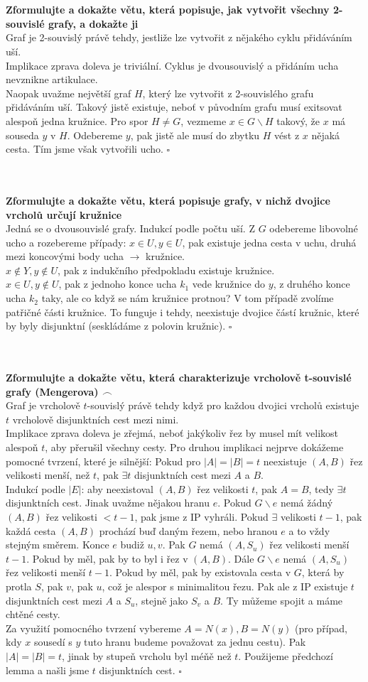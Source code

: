 \documentclass[a4paper]{article}
\newcommand{\led}{\hspace{0.2cm}$\square$}
\newcommand{\hlava}[1]{\text{} \\ \text{} \\ \text{} \hspace{-0.27cm} \textbf{#1} \\}
\begin{document}
\hlava{Zformulujte a dokažte větu, která popisuje, jak vytvořit všechny 2-souvislé grafy, a dokažte ji}
Graf je 2-souvislý právě tehdy, jestliže lze vytvořit z nějakého cyklu přidáváním uší.\\
Implikace zprava doleva je triviální. Cyklus je dvousouvislý a přidáním ucha nevznikne artikulace. \\
Naopak uvažme největší graf $H$, který lze vytvořit z 2-souvislého grafu přidáváním uší. Takový jistě existuje, neboť v původním grafu musí exitsovat alespoň jedna kružnice. Pro spor $H \ne G$, vezmeme $x\in G \backslash H$ takový, že $x$ má souseda $y$ v $H$. Odebereme $y$, pak jistě ale musí do zbytku $H$ vést z $x$ nějaká cesta. Tím jsme však vytvořili ucho. \led

\hlava{Zformulujte a dokažte větu, která popisuje grafy, v nichž dvojice vrcholů určují kružnice}
Jedná se o dvousouvislé grafy. Indukcí podle počtu uší. Z $G$ odebereme libovolné ucho a rozebereme případy:
$x \in U, y \in U$, pak existuje jedna cesta v uchu, druhá mezi koncovými body ucha $\rightarrow$ kružnice. \\
$x \notin Y, y \notin U$, pak z indukčního předpokladu existuje kružnice. \\
$x \in U, y \notin U$, pak z jednoho konce ucha $k_1$ vede kružnice do $y$, z druhého konce ucha $k_2$ taky, ale co když se nám kružnice protnou? V tom případě zvolíme patřičné části kružnice. To funguje i tehdy, neexistuje dvojice částí kružnic, které by byly disjunktní (seskládáme z polovin kružnic). \led

\hlava{Zformulujte a dokažte větu, která charakterizuje vrcholově t-souvislé grafy (Mengerova) $\frown$}
Graf je vrcholově $t$-souvislý právě tehdy když pro každou dvojici vrcholů existuje $t$ vrcholově disjunktních cest mezi nimi. \\
Implikace zprava doleva je zřejmá, neboť jakýkoliv řez by musel mít velikost alespoň $t$, aby přerušil všechny cesty. Pro druhou implikaci nejprve dokážeme pomocné tvrzení, které je silnější: Pokud pro $|A|=|B|=t$ neexistuje $(A,B)$ řez velikosti menší, než $t$, pak $\exists t$ disjunktních cest mezi $A$ a $B$. \\
Indukcí podle $|E|$: aby neexistoval $(A,B)$ řez velikosti $t$, pak $A=B$, tedy $\exists t$ disjunktních cest. Jinak uvažme nějakou hranu $e$. Pokud $G\backslash e$ nemá žádný $(A,B)$ řez velikosti $< t-1$, pak jsme z IP vyhráli. Pokud $\exists$ velikosti $t-1$, pak každá cesta $(A,B)$ prochází buď daným řezem, nebo hranou $e$ a to vždy stejným směrem. Konce $e$ budiž $u,v$. Pak $G$ nemá $(A,S_u)$ řez velikosti menší $t-1$. Pokud by měl, pak by to byl i řez v $(A,B)$. Dále $G\backslash e$ nemá $(A,S_u)$ řez velikosti menší $t-1$. Pokud by měl, pak by existovala cesta v $G$, která by protla $S$, pak $v$, pak $u$, což je alespor s minimalitou řezu. Pak ale z IP existuje $t$ disjunktních cest mezi $A$ a $S_u$, stejně jako $S_v$ a $B$. Ty můžeme spojit a máme chtěné cesty. \\
Za využití pomocného tvrzení vybereme $A=N(x), B=N(y)$ (pro případ, kdy $x$ sousedí s $y$ tuto hranu budeme považovat za jednu cestu). Pak $|A| = |B| = t$, jinak by stupeň vrcholu byl méňě než $t$. Použijeme předchozí lemma a našli jsme $t$ disjunktních cest. \led
\end{document}
